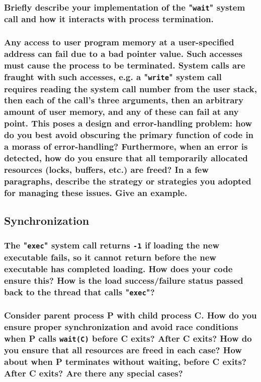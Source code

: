 \documentclass[sigconf, nonacm, balance=false, urlbreakonhyphens=true]{acmart}
\begin{document}
            \subsubsection{Briefly describe your implementation of the "\texttt{wait}" system call and how it interacts with process termination. }

            \subsubsection{Any access to user program memory at a user-specified address can fail due to a bad pointer value.  Such accesses must cause the process to be terminated.  System calls are fraught with such accesses, e.g. a "\texttt{write}" system call requires reading the system call number from the user stack, then each of the call's three arguments, then an arbitrary amount of user memory, and any of these can fail at any point.  This poses a design and error-handling problem: how do you best avoid obscuring the primary function of code in a morass of error-handling?  Furthermore, when an error is detected, how do you ensure that all temporarily allocated resources (locks, buffers, etc.) are freed?  In a few paragraphs, describe the strategy or strategies you adopted for managing these issues.  Give an example. }

        \subsection{Synchronization}

            \subsubsection{The "\texttt{exec}" system call returns \texttt{-1} if loading the new executable fails, so it cannot return before the new executable has completed loading.  How does your code ensure this?  How is the load success/failure status passed back to the thread that calls "\texttt{exec}"? }

            \subsubsection{Consider parent process P with child process C.  How do you ensure proper synchronization and avoid race conditions when P calls \texttt{wait(C)} before C exits?  After C exits?  How do you ensure that all resources are freed in each case?  How about when P terminates without waiting, before C exits?  After C exits?  Are there any special cases? }
\end{document}
